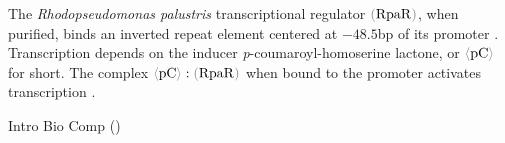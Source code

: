 \documentclass[12pt]{article}
\newcommand{\cbra}[1]{{\color{gray}\ensuremath{#1}}}
\newcommand{\signal}[1]{\ensuremath{\cbra{\langle}\mathrm{#1}\cbra{\rangle}}}
\newcommand{\protein}[1]{\ensuremath{\cbra{(}\mathrm{#1}\cbra{)}}}
\begin{document}
The \emph{Rhodopseudomonas palustris} transcriptional regulator
\protein{RpaR},
when purified,
binds an inverted repeat element 
centered at $-48.5$bp
of its promoter
\cite{HirakawaETAL2011}.
%
%
Transcription depends on the inducer 
\emph{p}-coumaroyl-homoserine lactone,
or \signal{pC} for short.
%
%
%
%
The complex 
$\signal{pC} : \protein{RpaR}$
when bound to the promoter
activates transcription
\cite[Discussion]{HirakawaETAL2011}.
 



\footnotesize



\leavevmode\vfill{\tiny\color{lightgray}\hfill{Intro Bio Comp (\DTMnow)}}
\end{document}
